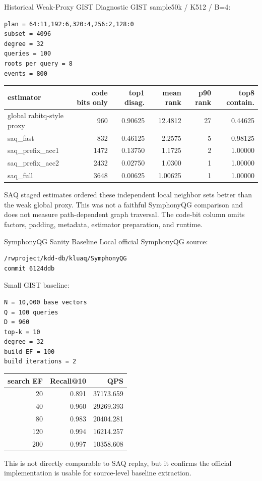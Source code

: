 \documentclass[aspectratio=169,10pt]{beamer}
\begin{document}
\begin{frame}[fragile]{Historical Weak-Proxy GIST Diagnostic}
\scriptsize
GIST sample50k / K512 / B=4:
\begin{lstlisting}
plan = 64:11,192:6,320:4,256:2,128:0
subset = 4096
degree = 32
queries = 100
roots per query = 8
events = 800
\end{lstlisting}

\begin{tabular}{lrrrrr}
\toprule
estimator & code bits only & top1 disag. & mean rank & p90 rank & top8 contain. \\
\midrule
global rabitq-style proxy & 960 & 0.90625 & 12.4812 & 27 & 0.44625 \\
saq\_fast & 832 & 0.46125 & 2.2575 & 5 & 0.98125 \\
saq\_prefix\_acc1 & 1472 & 0.13750 & 1.1725 & 2 & 1.00000 \\
saq\_prefix\_acc2 & 2432 & 0.02750 & 1.0300 & 1 & 1.00000 \\
saq\_full & 3648 & 0.00625 & 1.00625 & 1 & 1.00000 \\
\bottomrule
\end{tabular}

\vspace{0.6em}
\small
SAQ staged estimates ordered these independent local neighbor sets better than
the weak global proxy. This was not a faithful SymphonyQG comparison and does
not measure path-dependent graph traversal. The code-bit column omits factors,
padding, metadata, estimator preparation, and runtime.
\end{frame}

\begin{frame}[fragile]{SymphonyQG Sanity Baseline}
\scriptsize
Local official SymphonyQG source:
\begin{lstlisting}
/rwproject/kdd-db/kluaq/SymphonyQG
commit 6124ddb
\end{lstlisting}

Small GIST baseline:
\begin{lstlisting}
N = 10,000 base vectors
Q = 100 queries
D = 960
top-k = 10
degree = 32
build EF = 100
build iterations = 2
\end{lstlisting}

\begin{tabular}{rrr}
\toprule
search EF & Recall@10 & QPS \\
\midrule
20 & 0.891 & 37173.659 \\
40 & 0.960 & 29269.393 \\
80 & 0.983 & 20404.281 \\
120 & 0.994 & 16214.257 \\
200 & 0.997 & 10358.608 \\
\bottomrule
\end{tabular}

\vspace{0.8em}
\small
This is not directly comparable to SAQ replay, but it confirms the official
implementation is usable for source-level baseline extraction.
\end{frame}
\end{document}
